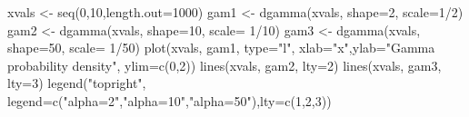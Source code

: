\begin{Schunk}
\begin{Sinput}
 xvals <- seq(0,10,length.out=1000)
 gam1 <- dgamma(xvals, shape=2, scale=1/2)
 gam2 <- dgamma(xvals, shape=10, scale= 1/10)
 gam3 <- dgamma(xvals, shape=50, scale= 1/50)
 plot(xvals, gam1, type="l", xlab="x",ylab="Gamma probability density",  ylim=c(0,2))
 lines(xvals, gam2, lty=2)
 lines(xvals, gam3, lty=3)
 legend("topright", legend=c("alpha=2","alpha=10","alpha=50"),lty=c(1,2,3))
\end{Sinput}
\end{Schunk}
